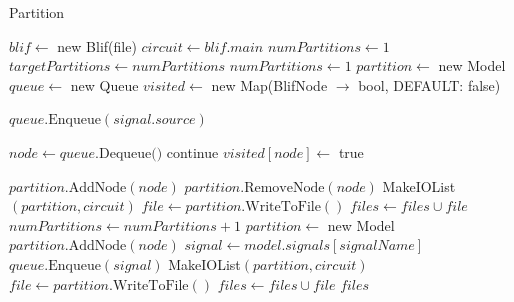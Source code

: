\documentclass[12pt,final,oneside,a4paper]{dwThesis} %
\begin{document}
   \begin{algorithm}
      \caption{Partition}\label{partition}

      \begin{algorithmic}[1]
         \State $blif \gets$
         new Blif(file)  
         \State $circuit \gets
         blif.main$ 
         \State $numPartitions \gets 1$
	\Repeat
		\State $targetPartitions \gets numPartitions$
		\State $numPartitions \gets 1$
	         \State
	         $partition \gets$ new Model  
	         \State $queue
	         \gets$ new Queue  
	         \State $visited \gets$ new
	         Map(BlifNode $\to$ bool, DEFAULT: false)
	
	         \State
	         $queue.\mbox{Enqueue}(signal.source)$ \EndFor
	
	         \State $node \gets queue.\mbox{Dequeue()}$
	         \State continue  \EndIf 
	         \State $visited[node] \gets $ true
	
	         \State $partition.\mbox{AddNode}(node)$
	         \State
	         $partition.\mbox{RemoveNode}(node)$ 
	         \State MakeIOList$(partition,
	         circuit)$ 
	         \State $file \gets partition.\mbox{WriteToFile}()$ 
	         \State
	         $files \gets files\cup file$ 
	         \State $numPartitions \gets
	         numPartitions+1$ 
	         \State $partition \gets$ new Model  
	         \State $partition.\mbox{AddNode}(node)$ \EndIf
	         \State $signal \gets
	         model.signals[signalName]$ 
	         \State $queue.\mbox{Enqueue}(signal)$
	         \EndFor
	         \EndWhile
	         \State
	         MakeIOList$(partition, circuit)$ 
	         \State $file \gets
	         partition.\mbox{WriteToFile}()$ 
	         \State $files \gets files\cup file$
	         \EndIf
         \Return $files$ \EndProcedure 
      \end{algorithmic}


   \end{algorithm}
\end{document}
